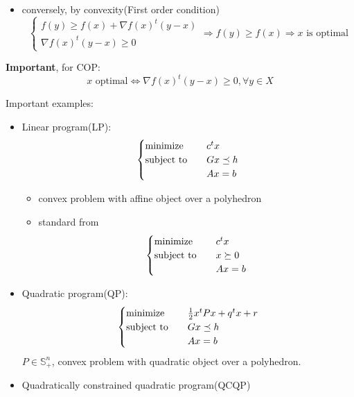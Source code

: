 \begin{remark}
\begin{itemize}
\begin{itemize}
                \item conversely, by convexity(First order condition) \[\begin{cases}
                    f(y) \ge f(x) + \nabla f(x)^t(y - x)\\
                    \nabla f(x)^t(y - x) \ge 0
                \end{cases} \Longrightarrow f(y) \ge f(x) \Longrightarrow x \text{ is optimal}\]
            \end{itemize}
            \textbf{Important}, for COP:\[x \text{ optimal} \Longleftrightarrow \nabla f(x)^t(y - x) \ge 0, \forall y \in X\]
    \end{itemize}
\end{remark}

\begin{remark}
    Important examples:
    \begin{itemize}
        \item Linear program(LP):
            \[\begin{cases}
                \operatorname{minimize} \quad &c^tx\\
                \operatorname{subject\ to} \quad &Gx \preceq h\\
                &Ax = b
            \end{cases}\]
            \begin{itemize}
                \item convex problem with affine object over a polyhedron
                \item standard from \[\begin{cases}
                    \operatorname{minimize} \quad &c^tx\\
                    \operatorname{subject\ to} \quad &x \succeq 0\\
                    &Ax = b
                \end{cases}\]
            \end{itemize}
        \item Quadratic program(QP):
            \[\begin{cases}
                \operatorname{minimize} \quad &\frac{1}{2}x^tPx + q^tx + r\\
                \operatorname{subject\ to} \quad &Gx \preceq h\\
                &Ax = b
            \end{cases}\]
            $P \in \mathbb{S}_{+}^n$, convex problem with quadratic object over a polyhedron.
        \item Quadratically constrained quadratic program(QCQP)

\end{itemize}
\end{remark}
